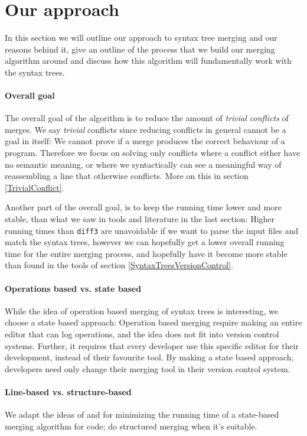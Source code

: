 \documentclass[11pt]{article}
\begin{document}
\clearpage

\section{Our approach}
In this section we will outline our approach to syntax tree merging and our reasons behind it, give an outline of the process that we build our merging algorithm around and discuss how this algorithm will fundamentally work with the syntax trees. 

\paragraph{Overall goal} The overall goal of the algorithm is to reduce the amount of \textit{trivial conflicts} of merges. We say \textit{trivial} conflicts since reducing conflicts in general cannot be a goal in itself: We cannot prove if a merge produces the correct behaviour of a program. Therefore we focus on solving only conflicts where a conflict either have no semantic meaning, or where we syntactically can see a meaningful way of reassembling a line that otherwise conflicts. More on this in section \ref{TrivialConflict}.

Another part of the overall goal, is to keep the running time lower and more stable, than what we saw in tools and literature in the last section: Higher running times than \texttt{diff3} are unavoidable if we want to parse the input files and match the syntax trees, however we can hopefully get a lower overall running time for the entire merging process, and hopefully have it become more stable than found in the tools of section \ref{SyntaxTreesVersionControl}.

\paragraph{Operations based vs. state based} While the idea of operation based merging of syntax trees is interesting, we choose a state based approach: Operation based merging require making an entire editor that can log operations, and the idea does not fit into version control systems. Further, it requires that every developer use this specific editor for their development, instead of their favourite tool. By making a state based approach, developers need only change their merging tool in their version control system.

\paragraph{Line-based vs. structure-based} We adapt the ideas of \citet{Olav} and \citet{Apel} for minimizing the running time of a state-based merging algorithm for code; do structured merging when it's suitable.
\end{document}
